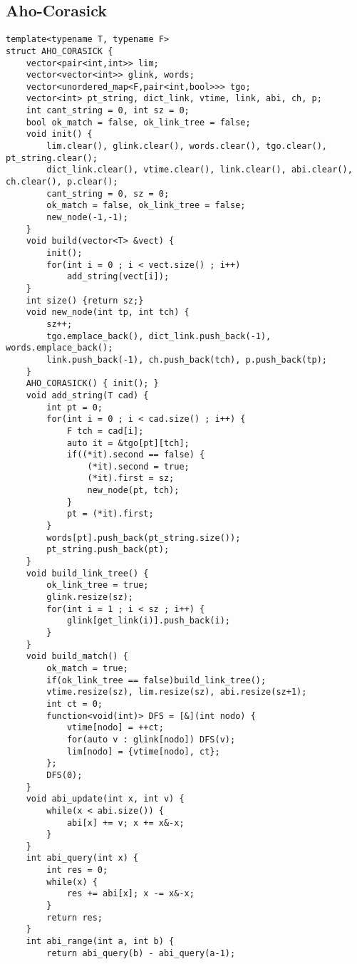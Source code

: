 \documentclass[landscape, 8pt, a4paper, oneside]{extarticle}
\begin{document}
\begin{multicols}{3}
\subsection{Aho-Corasick}
\begin{verbatim}
template<typename T, typename F>
struct AHO_CORASICK {
    vector<pair<int,int>> lim;
    vector<vector<int>> glink, words;
    vector<unordered_map<F,pair<int,bool>>> tgo;
    vector<int> pt_string, dict_link, vtime, link, abi, ch, p;
    int cant_string = 0, int sz = 0;
    bool ok_match = false, ok_link_tree = false;
    void init() {
        lim.clear(), glink.clear(), words.clear(), tgo.clear(), pt_string.clear();
        dict_link.clear(), vtime.clear(), link.clear(), abi.clear(), ch.clear(), p.clear();
        cant_string = 0, sz = 0;
        ok_match = false, ok_link_tree = false;
        new_node(-1,-1);
    }
    void build(vector<T> &vect) {
        init();
        for(int i = 0 ; i < vect.size() ; i++)
            add_string(vect[i]);
    }
    int size() {return sz;}
    void new_node(int tp, int tch) {
        sz++;
        tgo.emplace_back(), dict_link.push_back(-1), words.emplace_back();
        link.push_back(-1), ch.push_back(tch), p.push_back(tp);
    }
    AHO_CORASICK() { init(); }
    void add_string(T cad) {
        int pt = 0;
        for(int i = 0 ; i < cad.size() ; i++) {
            F tch = cad[i];
            auto it = &tgo[pt][tch];
            if((*it).second == false) {
                (*it).second = true;
                (*it).first = sz;
                new_node(pt, tch);
            }
            pt = (*it).first;
        }
        words[pt].push_back(pt_string.size());
        pt_string.push_back(pt);
    }
    void build_link_tree() {
        ok_link_tree = true;
        glink.resize(sz);
        for(int i = 1 ; i < sz ; i++) {
            glink[get_link(i)].push_back(i);
        }
    }
    void build_match() {
        ok_match = true;
        if(ok_link_tree == false)build_link_tree();
        vtime.resize(sz), lim.resize(sz), abi.resize(sz+1);
        int ct = 0;
        function<void(int)> DFS = [&](int nodo) {
            vtime[nodo] = ++ct;
            for(auto v : glink[nodo]) DFS(v);
            lim[nodo] = {vtime[nodo], ct};
        };
        DFS(0);
    }
    void abi_update(int x, int v) {
        while(x < abi.size()) {
            abi[x] += v; x += x&-x;
        }
    }
    int abi_query(int x) {
        int res = 0;
        while(x) {
            res += abi[x]; x -= x&-x;
        }
        return res;
    }
    int abi_range(int a, int b) {
        return abi_query(b) - abi_query(a-1);

\end{verbatim}
\end{multicols}
\end{document}
